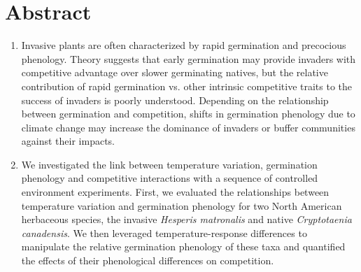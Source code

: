 \documentclass{article}[11pt]
\begin{document}
\section*{Abstract}
\begin{enumerate}
\item Invasive plants are often characterized by rapid germination and precocious phenology. Theory suggests that early germination may provide invaders with competitive advantage over slower germinating natives, but the relative contribution of rapid germination vs. other intrinsic competitive traits to the success of invaders is poorly understood. Depending on the relationship between germination and competition, shifts in germination phenology due to climate change may increase the dominance of invaders or buffer communities against their impacts. %

\item We investigated the link between temperature variation, germination phenology and competitive interactions with a sequence of controlled environment experiments. First, we evaluated the relationships between temperature variation and germination phenology for two North American herbaceous species, the invasive \textit{Hesperis matronalis} and native \textit{Cryptotaenia canadensis}. We then leveraged temperature-response differences to manipulate the relative germination phenology of these taxa and quantified the effects of their phenological differences on competition.


\end{enumerate}
\end{document}
